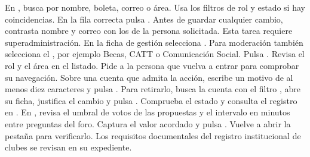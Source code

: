 En , busca por nombre, boleta, correo o área. Usa los filtros de rol y estado si hay coincidencias. En la fila correcta pulsa . Antes de guardar cualquier cambio, contrasta nombre y correo con los de la persona solicitada.
Esta tarea requiere superadministración. En la ficha de gestión selecciona . Para moderación también selecciona el , por ejemplo Becas, CATT o Comunicación Social. Pulsa . Revisa el rol y el área en el listado. Pide a la persona que vuelva a entrar para comprobar su navegación.
Sobre una cuenta que admita la acción, escribe un motivo de al menos diez caracteres y pulsa . Para retirarlo, busca la cuenta con el filtro , abre su ficha, justifica el cambio y pulsa . Comprueba el estado y consulta el registro en .
En , revisa el umbral de votos de las propuestas y el intervalo en minutos entre preguntas del foro. Captura el valor acordado y pulsa . Vuelve a abrir la pestaña para verificarlo. Los requisitos documentales del registro institucional de clubes se revisan en su expediente.

